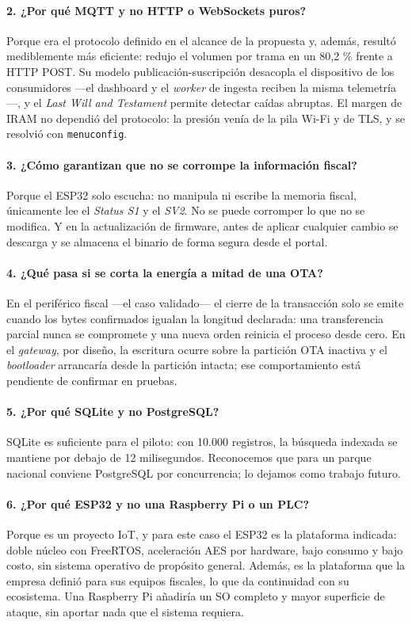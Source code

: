 \documentclass[11pt, a4paper]{article}
\begin{document}
\paragraph{2. ¿Por qué MQTT y no HTTP o WebSockets puros?}
Porque era el protocolo definido en el alcance de la propuesta y, además, resultó mediblemente más eficiente: redujo el volumen por trama en un 80,2 \% frente a HTTP POST. Su modelo publicación-suscripción desacopla el dispositivo de los consumidores —el dashboard y el \textit{worker} de ingesta reciben la misma telemetría—, y el \textit{Last Will and Testament} permite detectar caídas abruptas. El margen de IRAM no dependió del protocolo: la presión venía de la pila Wi-Fi y de TLS, y se resolvió con \texttt{menuconfig}.

\paragraph{3. ¿Cómo garantizan que no se corrompe la información fiscal?}
Porque el ESP32 solo escucha: no manipula ni escribe la memoria fiscal, únicamente lee el \textit{Status S1} y el \textit{SV2}. No se puede corromper lo que no se modifica. Y en la actualización de firmware, antes de aplicar cualquier cambio se descarga y se almacena el binario de forma segura desde el portal.

\paragraph{4. ¿Qué pasa si se corta la energía a mitad de una OTA?}
En el periférico fiscal —el caso validado— el cierre de la transacción solo se emite cuando los bytes confirmados igualan la longitud declarada: una transferencia parcial nunca se compromete y una nueva orden reinicia el proceso desde cero. En el \textit{gateway}, por diseño, la escritura ocurre sobre la partición OTA inactiva y el \textit{bootloader} arrancaría desde la partición intacta; ese comportamiento está pendiente de confirmar en pruebas.

\paragraph{5. ¿Por qué SQLite y no PostgreSQL?}
SQLite es suficiente para el piloto: con 10.000 registros, la búsqueda indexada se mantiene por debajo de 12 milisegundos. Reconocemos que para un parque nacional conviene PostgreSQL por concurrencia; lo dejamos como trabajo futuro.

\paragraph{6. ¿Por qué ESP32 y no una Raspberry Pi o un PLC?}
Porque es un proyecto IoT, y para este caso el ESP32 es la plataforma indicada: doble núcleo con FreeRTOS, aceleración AES por hardware, bajo consumo y bajo costo, sin sistema operativo de propósito general. Además, es la plataforma que la empresa definió para sus equipos fiscales, lo que da continuidad con su ecosistema. Una Raspberry Pi añadiría un SO completo y mayor superficie de ataque, sin aportar nada que el sistema requiera.
\end{document}

